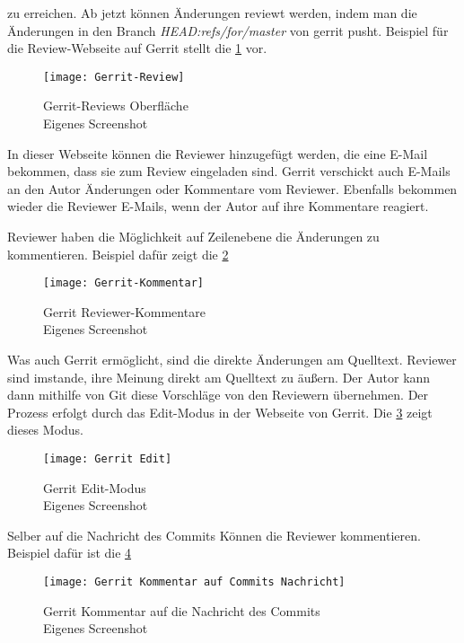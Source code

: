 zu erreichen. Ab jetzt können Änderungen reviewt werden, indem man die Änderungen in den Branch \textit{HEAD:refs/for/master} von gerrit pusht. Beispiel für die Review-Webseite auf Gerrit stellt die \cref{fig:Gerrit-Review} vor.

\begin{figure}[H]
	\centering
	\texttt{[image: Gerrit-Review]}
	\caption[Gerrit Reviews Oberfläche]{Gerrit-Reviews Oberfläche\\Eigenes Screenshot}
	\label{fig:Gerrit-Review}
\end{figure}

In dieser Webseite können die Reviewer hinzugefügt werden, die eine E-Mail bekommen, dass sie zum Review eingeladen sind. Gerrit verschickt auch E-Mails an den Autor Änderungen oder Kommentare vom Reviewer. Ebenfalls bekommen wieder die Reviewer E-Mails, wenn der Autor auf ihre Kommentare reagiert.

Reviewer haben die Möglichkeit auf Zeilenebene die Änderungen zu kommentieren. Beispiel dafür zeigt die \cref{fig:Gerrit Reviewer-Kommentare} 

\begin{figure}[H]
	\centering
	\texttt{[image: Gerrit-Kommentar]}
	\caption[Gerrit Reviewer-Kommentare]{Gerrit Reviewer-Kommentare\\Eigenes Screenshot}
	\label{fig:Gerrit Reviewer-Kommentare}
\end{figure}

Was auch Gerrit ermöglicht, sind die direkte Änderungen am Quelltext. Reviewer sind imstande, ihre Meinung direkt am Quelltext zu äußern. Der Autor kann dann mithilfe von Git diese Vorschläge von den Reviewern übernehmen. Der Prozess erfolgt durch das Edit-Modus in der Webseite von Gerrit. Die \cref{fig:Gerrit Edit-Modus} zeigt dieses Modus.

\begin{figure}[H]
	\centering
	\texttt{[image: Gerrit Edit]}
	\caption[Gerrit Edit-Modus]{Gerrit Edit-Modus\\Eigenes Screenshot}
	\label{fig:Gerrit Edit-Modus}
\end{figure}

Selber auf die Nachricht des Commits Können die Reviewer kommentieren. Beispiel dafür ist die \ref{fig:Gerrit Kommentar auf Commits Nachricht}

\begin{figure}[H]
	\centering
	\texttt{[image: Gerrit Kommentar auf Commits Nachricht]}
	\caption[Gerrit Kommentar auf die Nachricht des Commits]{Gerrit Kommentar auf die Nachricht des Commits\\Eigenes Screenshot}
	\label{fig:Gerrit Kommentar auf Commits Nachricht}
\end{figure}




